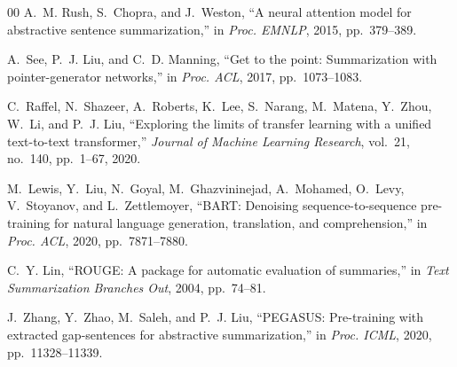 \documentclass[conference]{IEEEtran}
\begin{document}
\begin{thebibliography}{00}
A.~M. Rush, S.~Chopra, and J.~Weston, ``A neural attention model for
abstractive sentence summarization,''
in \textit{Proc. EMNLP}, 2015, pp.~379--389.

A.~See, P.~J. Liu, and C.~D. Manning, ``Get to the point: Summarization
with pointer-generator networks,''
in \textit{Proc. ACL}, 2017, pp.~1073--1083.

C.~Raffel, N.~Shazeer, A.~Roberts, K.~Lee, S.~Narang, M.~Matena,
Y.~Zhou, W.~Li, and P.~J. Liu, ``Exploring the limits of transfer
learning with a unified text-to-text transformer,''
\textit{Journal of Machine Learning Research}, vol.~21, no.~140,
pp.~1--67, 2020.

M.~Lewis, Y.~Liu, N.~Goyal, M.~Ghazvininejad, A.~Mohamed, O.~Levy,
V.~Stoyanov, and L.~Zettlemoyer, ``BART: Denoising sequence-to-sequence
pre-training for natural language generation, translation, and
comprehension,''
in \textit{Proc. ACL}, 2020, pp.~7871--7880.

C.~Y. Lin, ``ROUGE: A package for automatic evaluation of summaries,''
in \textit{Text Summarization Branches Out}, 2004, pp.~74--81.

J.~Zhang, Y.~Zhao, M.~Saleh, and P.~J. Liu, ``PEGASUS: Pre-training with
extracted gap-sentences for abstractive summarization,''
in \textit{Proc. ICML}, 2020, pp.~11328--11339.

\end{thebibliography}
\end{document}
